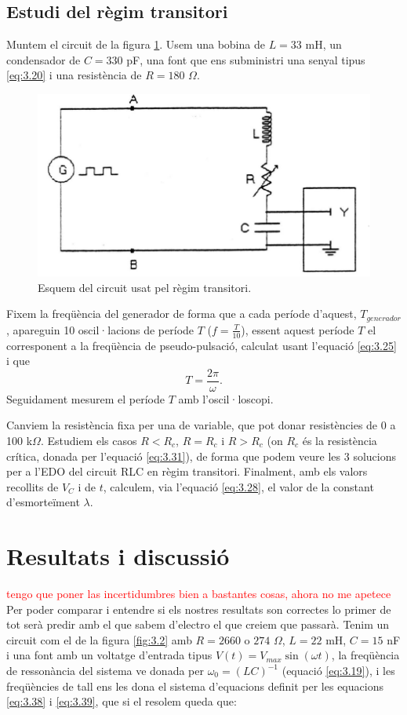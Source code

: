 \documentclass[a4paper,10.5pt]{report}
\begin{document}
\subsection{Estudi del règim transitori}
Muntem el circuit de la figura \ref{fig:3.3}. Usem una bobina de $L = 33$ mH, un condensador de $C = 330$ pF, una font que ens subministri una senyal tipus \eqref{eq:3.20} i una resistència de $R = 180$ $\Omega$.

\begin{figure}[h]
	\centering
	\includegraphics[width=0.5\linewidth]{screenshot006}
	\caption{Esquem del circuit usat pel règim transitori.}
	\label{fig:3.3}
\end{figure}

Fixem la freqüència del generador de forma que a cada període d'aquest, $T_{generador}$, apareguin 10 oscil·lacions de període $T$ ($f = \frac{T}{10}$), essent aquest període $T$ el corresponent a la freqüència de pseudo-pulsació, calculat usant l'equació \eqref{eq:3.25} i que
\begin{equation}
	T = \frac{2\pi}{\omega}.
\end{equation}
Seguidament mesurem el període $T$ amb l'oscil·loscopi. 

Canviem la resistència fixa per una de variable, que pot donar resistències de 0 a 100 k$\Omega$. Estudiem els casos $R<R_c$, $R=R_c$ i $R>R_c$ (on $R_c$ és la resistència crítica, donada per l'equació \eqref{eq:3.31}), de forma que podem veure les 3 solucions per a l'EDO del circuit RLC en règim transitori. Finalment, amb els valors recollits de $V_C$ i de $t$, calculem, via l'equació \eqref{eq:3.28}, el valor de la constant d'esmorteïment $\lambda$.


\section{Resultats i discussió}
\textcolor{red}{tengo que poner las incertidumbres bien a bastantes cosas, ahora no me apetece}\\
Per poder comparar i entendre si els nostres resultats son correctes lo primer de tot serà predir amb el que sabem d'electro el que creiem que passarà. Tenim un circuit com el de la figura \ref{fig:3.2} amb $R=2660$ o $274$ $\Omega$, $L=22$ mH, $C=15$ nF i una font amb un voltatge d'entrada tipus $V(t) = V_{max}\sin(\omega t)$, la freqüència de ressonància del sistema ve donada per $\omega_0 = (LC)^{-1}$ (equació \ref{eq:3.19}), i les freqüències de tall ens les dona el sistema d'equacions definit per les equacions \ref{eq:3.38} i \ref{eq:3.39}, que si el resolem queda que:
\end{document}
